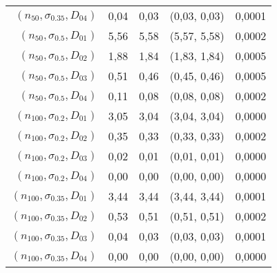 \documentclass[preprint,12pt]{elsarticle}
\begin{document}
\begin{table}[htbp]
\begin{tabular}{rrrcr}
    $(n_{50},\sigma_{0.35},D_{04})$ & 0,04  & 0,03  & (0,03, 0,03) & 0,0001\\
    $(n_{50},\sigma_{0.5},D_{01})$ & 5,56  & 5,58  & (5,57, 5,58) & 0,0002 \\
    $(n_{50},\sigma_{0.5},D_{02})$  & 1,88  & 1,84  & (1,83, 1,84) & 0,0005 \\
    $(n_{50},\sigma_{0.5},D_{03})$ & 0,51  & 0,46  & (0,45, 0,46) & 0,0005 \\
    $(n_{50},\sigma_{0.5},D_{04})$ & 0,11  & 0,08  & (0,08, 0,08) & 0,0002 \\
    $(n_{100},\sigma_{0.2},D_{01})$  & 3,05  & 3,04  & (3,04, 3,04) & 0,0000 \\
    $(n_{100},\sigma_{0.2},D_{02})$ & 0,35  & 0,33  & (0,33, 0,33) & 0,0002 \\
    $(n_{100},\sigma_{0.2},D_{03})$ & 0,02  & 0,01  & (0,01, 0,01) & 0,0000 \\
    $(n_{100},\sigma_{0.2},D_{04})$ & 0,00  & 0,00  & (0,00, 0,00) & 0,0000 \\
    $(n_{100},\sigma_{0.35},D_{01})$ & 3,44  & 3,44  & (3,44, 3,44) & 0,0001 \\
    $(n_{100},\sigma_{0.35},D_{02})$ & 0,53  & 0,51  & (0,51, 0,51) & 0,0002 \\
    $(n_{100},\sigma_{0.35},D_{03})$ & 0,04  & 0,03  & (0,03, 0,03) & 0,0001 \\
    $(n_{100},\sigma_{0.35},D_{04})$ & 0,00  & 0,00  & (0,00, 0,00) & 0,0000 \\
    \bottomrule
    \end{tabular}%
  \label{uniform1}%
\end{table}%
\end{document}
